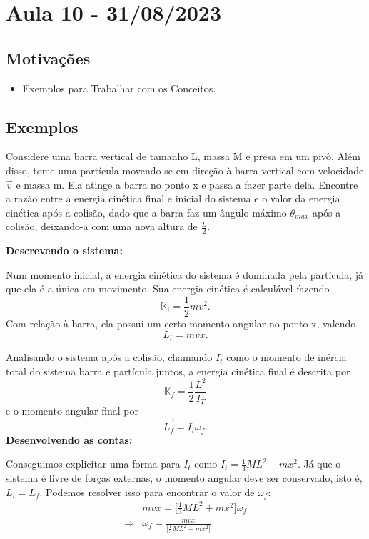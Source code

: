 \documentclass[PhysicsII/physicsII_notes.tex]{subfiles}
\begin{document}
\section{Aula 10 - 31/08/2023}
\subsection{Motivações}
\begin{itemize}
	\item Exemplos para Trabalhar com os Conceitos.
\end{itemize}
\subsection{Exemplos}
\begin{example}
	Considere uma barra vertical de tamanho L, massa M e presa em um pivô. Além disso, tome uma partícula movendo-se em direção à barra vertical com velocidade \(\vec{v}\) e massa m.
	Ela atinge a barra no ponto x e passa a fazer parte dela. Encontre a razão entre a energia cinética final e inicial do sistema e o valor da energia cinética após a colisão, dado
	que a barra faz um ângulo máximo \(\theta_{max}\) após a colisão, deixando-a com uma nova altura de \(\frac{L}{2}\).

	\textbf{Descrevendo o sistema:}

	Num momento inicial, a energia cinética do sistema é dominada pela partícula, já que ela é a única em movimento. Sua energia cinética é calculável fazendo
	\[
		\mathbb{K}_{i} = \frac{1}{2}mv^{2}.
	\]
	Com relação à barra, ela possui um certo momento angular no ponto x, valendo
	\[
		L_{i} = mvx.
	\]

	Analisando o sistema após a colisão, chamando \(I_{t}\) como o momento de inércia total do sistema barra e partícula juntos, a energia cinética final
	é descrita por
	\[
		\mathbb{K}_{f} = \frac{1}{2}\frac{L^{2}}{I_{T}}
	\]
	e o momento angular final por
	\[
		\vec{L_{f}} = I_{t}\omega_{f}.
	\]
	\textbf{Desenvolvendo as contas:}

	Conseguimos explicitar uma forma para \(I_{t}\) como \(I_{t} = \frac{1}{3}ML^{2} + mx^{2}\). Já que o sistema é livre de forças externas, o momento angular deve ser conservado, isto é,
	\(L_{i} = L_{f}\). Podemos resolver isso para encontrar o valor de \(\omega_{f}:\)
	\begin{align*}
		            & mvx = \biggl[\frac{1}{3}ML^{2} + mx^{2}\biggr]\omega_{f}        \\
		\Rightarrow & \omega_{f} = \frac{mvx}{\biggl[\frac{1}{3}ML^{2}+mx^{2}\biggr]}
	\end{align*}


\end{example}
\end{document}
